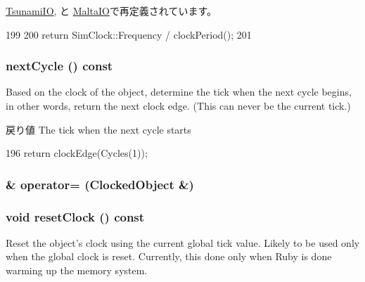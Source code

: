 \hyperlink{classTsunamiIO_ae7d31c6aab76d9d4e74e5e7227337651}{TsunamiIO}, と \hyperlink{classMaltaIO_ae7d31c6aab76d9d4e74e5e7227337651}{MaltaIO}で再定義されています。


\begin{DoxyCode}
199     {
200         return SimClock::Frequency / clockPeriod();
201     }
\end{DoxyCode}
\hypertarget{classClockedObject_abbbab15df430cd1edc7f3ef750198a0c}{
\subsubsection[{nextCycle}]{ nextCycle () const}}
\label{classClockedObject_abbbab15df430cd1edc7f3ef750198a0c}
Based on the clock of the object, determine the tick when the next cycle begins, in other words, return the next clock edge. (This can never be the current tick.)

\begin{DoxyReturn}{戻り値}
The tick when the next cycle starts 
\end{DoxyReturn}



\begin{DoxyCode}
196     { return clockEdge(Cycles(1)); }
\end{DoxyCode}
\hypertarget{classClockedObject_a2ade080e5da78e3b6e5821d3ad92623a}{
\subsubsection[{operator=}]{\& operator= ({\bf ClockedObject} \&)}}
\label{classClockedObject_a2ade080e5da78e3b6e5821d3ad92623a}
\hypertarget{classClockedObject_a7c7c8afaf47b89e48578fabd1ce491da}{
\subsubsection[{resetClock}]{\setlength{\rightskip}{0pt plus 5cm}void resetClock () const}}
\label{classClockedObject_a7c7c8afaf47b89e48578fabd1ce491da}
Reset the object's clock using the current global tick value. Likely to be used only when the global clock is reset. Currently, this done only when Ruby is done warming up the memory system. 


